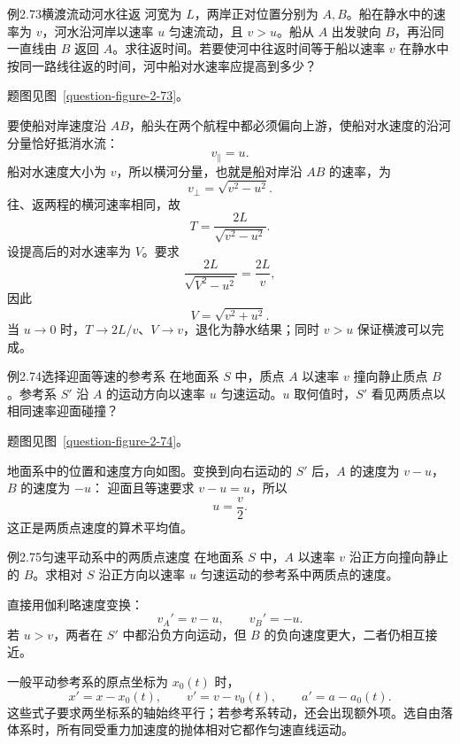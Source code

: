 \begin{origexamplebox}{例2.73\quad 横渡流动河水往返}
河宽为 $L$，两岸正对位置分别为 $A,B$。船在静水中的速率为 $v$，河水沿河岸以速率 $u$ 匀速流动，且 $v>u$。船从 $A$ 出发驶向 $B$，再沿同一直线由 $B$ 返回 $A$。求往返时间。若要使河中往返时间等于船以速率 $v$ 在静水中按同一路线往返的时间，河中船对水速率应提高到多少？
\par 题图见图~\ref{question-figure-2-73}。
\KQuestionCV
\end{origexamplebox}
\begin{xesolution}
要使船对岸速度沿 $AB$，船头在两个航程中都必须偏向上游，使船对水速度的沿河分量恰好抵消水流：
\CrossRiverRoundTripDiagram
\[
v_{\parallel}=u.
\]
船对水速度大小为 $v$，所以横河分量，也就是船对岸沿 $AB$ 的速率，为
\[
v_{\perp}=\sqrt{v^2-u^2}.
\]
往、返两程的横河速率相同，故
\[
\boxed{T=\frac{2L}{\sqrt{v^2-u^2}}}.
\]
设提高后的对水速率为 $V$。要求
\[
\frac{2L}{\sqrt{V^2-u^2}}=\frac{2L}{v},
\]
因此
\[
\boxed{V=\sqrt{v^2+u^2}}.
\]
当 $u\to0$ 时，$T\to2L/v$、$V\to v$，退化为静水结果；同时 $v>u$ 保证横渡可以完成。
\end{xesolution}

\KinematicKeepSpace{8cm}
\begin{origexamplebox}{例2.74\quad 选择迎面等速的参考系}
在地面系 $S$ 中，质点 $A$ 以速率 $v$ 撞向静止质点 $B$。参考系 $S'$ 沿 $A$ 的运动方向以速率 $u$ 匀速运动。$u$ 取何值时，$S'$ 看见两质点以相同速率迎面碰撞？
\par 题图见图~\ref{question-figure-2-74}。
\KQuestionCW
\end{origexamplebox}
\begin{xesolution}
地面系中的位置和速度方向如图。变换到向右运动的 $S'$ 后，$A$ 的速度为 $v-u$，$B$ 的速度为 $-u$：
\EqualSpeedFrameDiagram
迎面且等速要求 $v-u=u$，所以
\[
\boxed{u=\frac v2}.
\]
这正是两质点速度的算术平均值。
\end{xesolution}

\begin{origexamplebox}{例2.75\quad 匀速平动系中的两质点速度}
在地面系 $S$ 中，$A$ 以速率 $v$ 沿正方向撞向静止的 $B$。求相对 $S$ 沿正方向以速率 $u$ 匀速运动的参考系中两质点的速度。
\end{origexamplebox}
\begin{xesolution}
直接用伽利略速度变换：
\[
\boxed{v_A'=v-u},\qquad \boxed{v_B'=-u}.
\]
若 $u>v$，两者在 $S'$ 中都沿负方向运动，但 $B$ 的负向速度更大，二者仍相互接近。
\end{xesolution}

一般平动参考系的原点坐标为 $x_0(t)$ 时，
\begin{equation}
x'=x-x_0(t),\qquad v'=v-v_0(t),\qquad a'=a-a_0(t).
\end{equation}
这些式子要求两坐标系的轴始终平行；若参考系转动，还会出现额外项。选自由落体系时，所有同受重力加速度的抛体相对它都作匀速直线运动。

